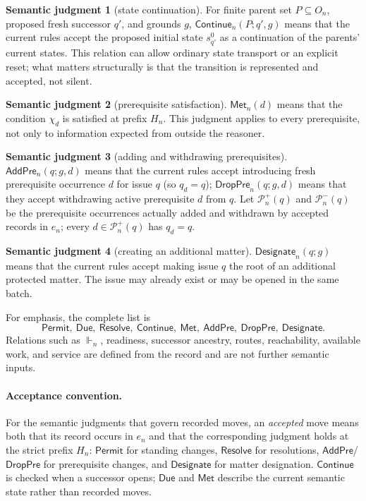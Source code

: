 \documentclass[11pt]{article}
\theoremstyle{definition}
\newtheorem*{semantics}{Semantic judgment}
\theoremstyle{remark}
\newcommand{\Permit}{\mathsf{Permit}}
\newcommand{\Due}{\mathsf{Due}}
\newcommand{\Resolve}{\mathsf{Resolve}}
\newcommand{\Continue}{\mathsf{Continue}}
\newcommand{\Met}{\mathsf{Met}}
\newcommand{\AddPre}{\mathsf{AddPre}}
\newcommand{\DropPre}{\mathsf{DropPre}}
\newcommand{\Designate}{\mathsf{Designate}}
\newcommand{\Pre}{\mathcal P}
\begin{document}
\begin{semantics}[state continuation]
For finite parent set $P\subseteq O_n$, proposed fresh successor $q'$, and
grounds $g$, $\Continue_n(P;q',g)$ means that the current rules accept the
proposed initial state $s_{q'}^0$ as a continuation of the parents' current
states. This relation can allow ordinary state transport or an explicit reset;
what matters structurally is that the transition is represented and accepted,
not silent.
\end{semantics}

\begin{semantics}[prerequisite satisfaction]
$\Met_n(d)$ means that the condition $\chi_d$ is satisfied at prefix $H_n$.
This judgment applies to every prerequisite, not only to information expected
from outside the reasoner.
\end{semantics}

\begin{semantics}[adding and withdrawing prerequisites]
$\AddPre_n(q;g,d)$ means that the current rules accept introducing fresh
prerequisite occurrence $d$ for issue $q$ (so $q_d=q$); $\DropPre_n(q;g,d)$
means that they accept withdrawing active prerequisite $d$ from $q$. Let
$\Pre_n^+(q)$ and $\Pre_n^-(q)$ be the prerequisite occurrences actually added
and withdrawn by accepted records in $e_n$; every $d\in\Pre_n^+(q)$ has
$q_d=q$.
\end{semantics}

\begin{semantics}[creating an additional matter]
$\Designate_n(q;g)$ means that the current rules accept making issue $q$ the
root of an additional protected matter. The issue may already exist or may be
opened in the same batch.
\end{semantics}

For emphasis, the complete list is
\[
 \Permit,\ \Due,\ \Resolve,\ \Continue,\ \Met,\ \AddPre,\ \DropPre,\ \Designate.
\]
Relations such as $\Vdash_n$, readiness, successor ancestry, routes,
reachability, available work, and service are defined from the record and are
not further semantic inputs.

\paragraph{Acceptance convention.}
For the semantic judgments that govern recorded moves, an \emph{accepted} move
means both that its record occurs in $e_n$ and that the corresponding judgment
holds at the strict prefix $H_n$: $\Permit$ for standing changes, $\Resolve$
for resolutions, $\AddPre$/$\DropPre$ for prerequisite changes, and
$\Designate$ for matter designation. $\Continue$ is checked when a successor
opens; $\Due$ and $\Met$ describe the current semantic state rather than
recorded moves.
\end{document}
